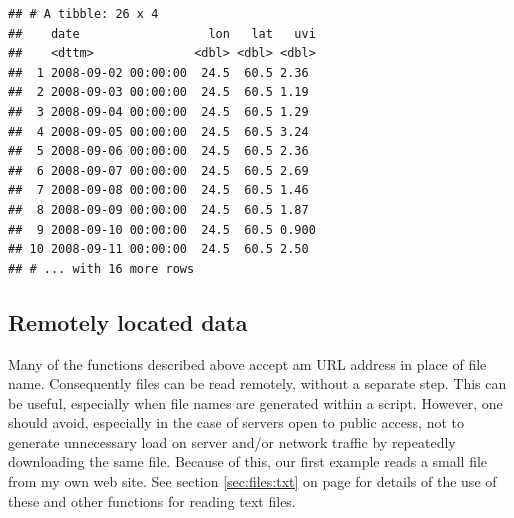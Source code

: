 \documentclass[krantz2]{krantz}\usepackage{knitr}%
\begin{document}
\begin{knitrout}\footnotesize
{}\color{fgcolor}\begin{kframe}
\begin{alltt}
 \hlkwb{<-}
    \hlstd{(} \hlstd{=}  \hlstd{=}\hlstd{),}
            \hlstd{= longitude[}\hlstd{],}
            \hlstd{= latitude[}\hlstd{],}
            \hlstd{=}  \hlstd{)[}\hlstd{,}\hlstd{,]}
           \hlstd{)}
\end{alltt}
\begin{verbatim}
## # A tibble: 26 x 4
##    date                  lon   lat   uvi
##    <dttm>              <dbl> <dbl> <dbl>
##  1 2008-09-02 00:00:00  24.5  60.5 2.36 
##  2 2008-09-03 00:00:00  24.5  60.5 1.19 
##  3 2008-09-04 00:00:00  24.5  60.5 1.29 
##  4 2008-09-05 00:00:00  24.5  60.5 3.24 
##  5 2008-09-06 00:00:00  24.5  60.5 2.36 
##  6 2008-09-07 00:00:00  24.5  60.5 2.69 
##  7 2008-09-08 00:00:00  24.5  60.5 1.46 
##  8 2008-09-09 00:00:00  24.5  60.5 1.87 
##  9 2008-09-10 00:00:00  24.5  60.5 0.900
## 10 2008-09-11 00:00:00  24.5  60.5 2.50 
## # ... with 16 more rows
\end{verbatim}
\end{kframe}
\end{knitrout}

\subsection{Remotely located data}\label{sec:files:remote}

Many of the functions described above accept am URL address in place of file name. Consequently files can be read remotely, without a separate step. This can be useful, especially when file names are generated within a script. However, one should avoid, especially in the case of servers open to public access, not to generate unnecessary load on server and/or network traffic by repeatedly downloading the same file. Because of this, our first example reads a small file from my own web site. See section \ref{sec:files:txt} on page \pageref{sec:files:txt} for details of the use of these and other functions for reading text files.
\end{document}
